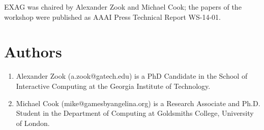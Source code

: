 \documentclass[10pt,a4paper]{article}
\begin{document}
EXAG was chaired by Alexander Zook and Michael Cook; the papers of the workshop were published as AAAI Press Technical Report WS-14-01.



\section*{Authors}
\begin{enumerate}
\item Alexander Zook (a.zook@gatech.edu) is a PhD Candidate in the School of Interactive Computing at the Georgia Institute of Technology.
\item Michael Cook (mike@gamesbyangelina.org) is a Research Associate and Ph.D. Student in the Department of Computing at Goldsmiths College, University of London.
\end{enumerate}
\end{document}
